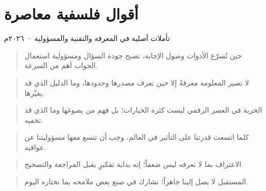 \documentclass[12pt,a4paper,openany]{book}
\begin{document}
\clearpage\chapter*{أقوال فلسفية معاصرة}

تأملات أصلية في المعرفة والتقنية والمسؤولية · ٢٠٢٦م


\begin{quote}
حين تُسرّع الأدوات وصول الإجابة، تصبح جودة السؤال ومسؤولية استعمال الجواب أهم من السرعة.
\end{quote}


\begin{quote}
لا تصير المعلومة معرفةً إلا حين نعرف مصدرها وحدودها، وما الدليل الذي قد يغيّرها.
\end{quote}


\begin{quote}
الحرية في العصر الرقمي ليست كثرة الخيارات؛ بل فهم من يصوغها وما الذي قد تخفيه.
\end{quote}


\begin{quote}
كلما اتسعت قدرتنا على التأثير في العالم، وجب أن تتسع معها مسؤوليتنا عن عواقبه.
\end{quote}


\begin{quote}
الاعتراف بما لا نعرفه ليس ضعفاً؛ إنه بداية تفكيرٍ يقبل المراجعة والتصحيح.
\end{quote}


\begin{quote}
المستقبل لا يصل إلينا جاهزاً؛ نشارك في صنع بعض ملامحه بما نختاره اليوم.
\end{quote}
\end{document}
